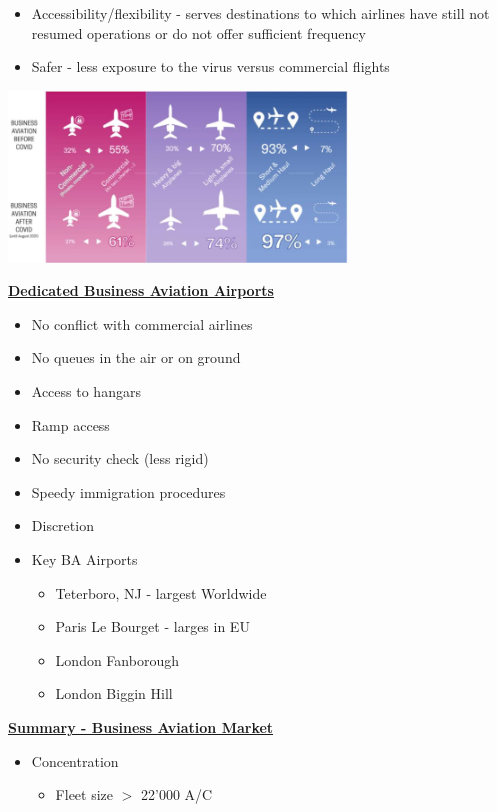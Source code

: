 \documentclass[9pt, landscape, fleqn]{scrartcl}
\begin{document}
\begin{multicols*}{3}
\begin{itemize}
    \begin{itemize}
        \item Accessibility/flexibility - serves destinations to which airlines have still not resumed operations
        or do not offer sufficient frequency
        \item Safer - less exposure to the virus versus commercial flights
    \end{itemize}
\end{itemize}
\begin{center}
    \includegraphics[width=9cm]{Images/Winners_and_Losers.png}
\end{center}
\underline{\textbf{Dedicated Business Aviation Airports}}
\begin{itemize}
    \item No conflict with commercial airlines
    \item No queues in the air or on ground
    \item Access to hangars 
    \item Ramp access
    \item No security check (less rigid)
    \item Speedy immigration procedures
    \item Discretion 
    \item Key BA Airports
    \begin{itemize}
        \item Teterboro, NJ - largest Worldwide
        \item Paris Le Bourget - larges in EU 
        \item London Fanborough
        \item London Biggin Hill
    \end{itemize}
\end{itemize}
\underline{\textbf{Summary - Business Aviation Market}}
\begin{itemize}
    \item Concentration 
    \begin{itemize}
        \item Fleet size $>$ 22'000 A/C

\end{itemize}
\end{itemize}
\end{multicols*}
\end{document}
